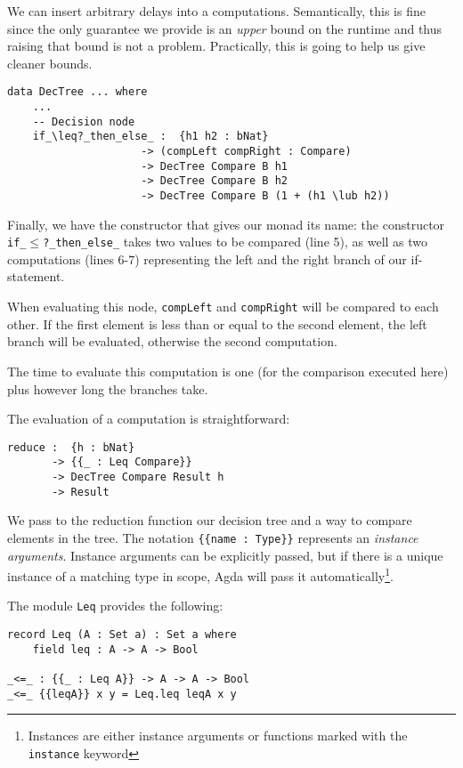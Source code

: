 We can insert arbitrary delays into a computations. Semantically, this is fine since the only guarantee we provide is an \emph{upper} bound on the runtime and thus raising that bound is not a problem. Practically, this is going to help us give cleaner bounds.

\begin{lstlisting}[caption={The DecTree monad (branching)},label={lst:dectree:5},emph={DecTree,if,then,else}]
data DecTree ... where
    ...
    -- Decision node
    if_\leq?_then_else_ :  {h1 h2 : bNat}
                     -> (compLeft compRight : Compare)
                     -> DecTree Compare B h1
                     -> DecTree Compare B h2
                     -> DecTree Compare B (1 + (h1 \lub h2))
\end{lstlisting}

Finally, we have the constructor that gives our monad its name: the constructor \texttt{if\_$\leq$?\_then\_else\_} takes two values to be compared (line 5), as well as two computations (lines 6-7) representing the left and the right branch of our if-statement.

When evaluating this node, \texttt{compLeft} and \texttt{compRight} will be compared to each other. If the first element is less than or equal to the second element, the left branch will be evaluated, otherwise the second computation.

The time to evaluate this computation is one (for the comparison executed here) plus however long the branches take.

The evaluation of a computation is straightforward:

\begin{lstlisting}[caption={Evaluating the monad},label={lst:dectree-eval:1},emph={reduce,DecTree}]
reduce :  {h : bNat}
       -> {{_ : Leq Compare}}
       -> DecTree Compare Result h
       -> Result
\end{lstlisting}

We pass to the reduction function our decision tree and a way to compare elements in the tree. The notation \texttt{\{\{name : Type\}\}} represents an \emph{instance arguments}. Instance arguments can be explicitly passed, but if there is a unique instance of a matching type in scope, Agda will pass it automatically\footnote{Instances are either instance arguments or functions marked with the \texttt{instance} keyword}.

The module \texttt{Leq} provides the following:

\begin{lstlisting}[caption={Module Leq},label={lst:dectree:leq},emph={Leq}]
record Leq (A : Set a) : Set a where
    field leq : A -> A -> Bool

_<=_ : {{_ : Leq A}} -> A -> A -> Bool
_<=_ {{leqA}} x y = Leq.leq leqA x y
\end{lstlisting}

